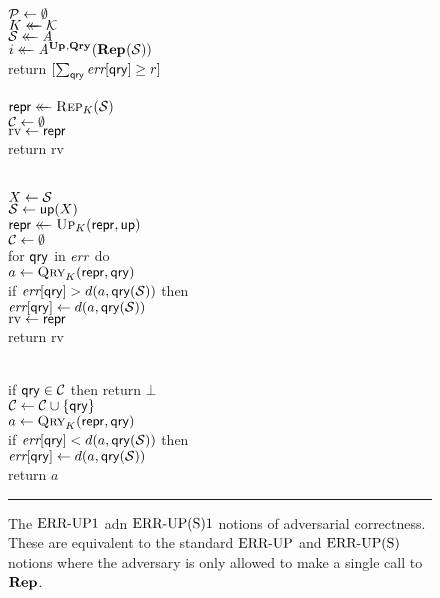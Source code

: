 \begin{figure}[t]
  {
     \\[2pt]
      $\setP \gets \emptyset$\\
      $\key \getsr \keys$\\
      $\col \getsr \advA$\\
      $i \getsr \advA^{\UPO,\QRYO}(\REPO(\col))$\\
      return $[\sum_\qry \err[\qry] \geq r]$ 
    \\[6pt]
    \oraclev{$\REPO(\col)$}\\[2pt]
      $\pub \getsr \Rep_\key(\col)$\\
      $\setC \gets \emptyset$\\
      $\mathrm{rv} \gets \pub$  \\
      return $\mathrm{rv}$
  }
  {
    \oraclev{$\UPO(\up)$}\\[2pt]
      $X \gets \col$ \\
      $\col \gets \up(X)$\\
      $\pub \getsr \Up_\key(\pub, \up)$\\
      $\setC \gets \emptyset$\\
      for $\qry$ in $\err$ do\\
      \tab $a \gets \Qry_K(\pub, \qry)$\\
      \tab if $\err[\qry] > d(a,\qry(\col))$ then\\
      \tab\tab$\err[\qry] \gets d(a,\qry(\col))$\\
      $\mathrm{rv} \gets \pub$ \\
      return $\mathrm{rv}$
      \medskip

    \oraclev{$\QRYO(\qry)$}\\[2pt]
      if $\qry \in \setC$ then return $\bot$\\
      $\setC \gets \setC \union \{\qry\}$\\
      $a \gets \Qry_K(\pub, \qry)$\\
      if $\err[\qry] < d(a,\qry(\col))$ then\\
      \tab$\err[\qry] \gets d(a,\qry(\col))$\\
      return $a$
  }
  \caption{The $\errep1$ adn $\erreps1$ notions of adversarial correctness. These are equivalent to the standard $\errep$ and $\erreps$ notions where the adversary is only allowed to make a single call to $\REPO$.}
  \vspace{6pt}\hrule
  \label{fig:security}
\end{figure}